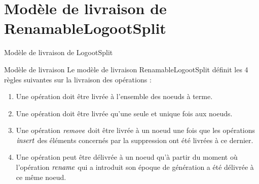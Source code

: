 \section{Modèle de livraison de RenamableLogootSplit}

\begin{frame}{Modèle de livraison de LogootSplit}
    \begin{block}{Modèle de livraison}
      Le modèle de livraison RenamableLogootSplit définit les 4 règles suivantes sur la livraison des opérations :
      \begin{enumerate}
        \item Une opération doit être livrée à l'ensemble des noeuds à terme.
        \item Une opération doit être livrée qu'une seule et unique fois aux noeuds.
        \item Une opération $\mathit{remove}$ doit être livrée à un noeud une fois que les opérations $\mathit{insert}$ des éléments concernés par la suppression ont été livrées à ce dernier.
        \item Une opération peut être délivrée à un noeud qu'à partir du moment où l'opération $\mathit{rename}$ qui a introduit son époque de génération a été délivrée à ce même noeud.
      \end{enumerate}
    \end{block}
\end{frame}
